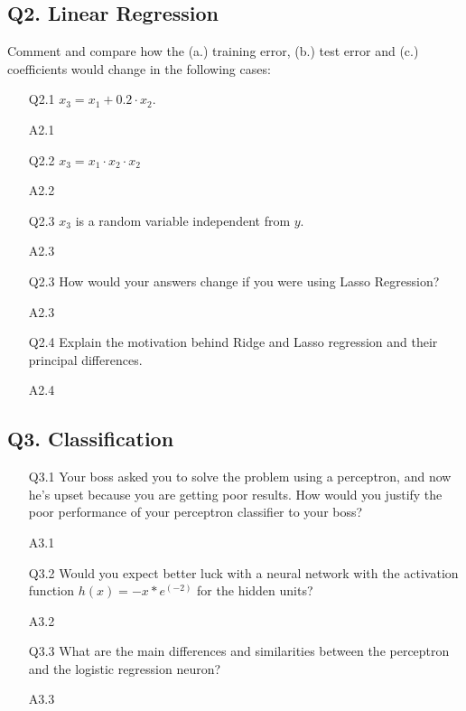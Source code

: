 \documentclass[11pt]{scrartcl}
\begin{document}
\subsection*{Q2. Linear Regression}
Comment and compare how the (a.) training error, (b.) test error and (c.) coefficients would change in the following cases:
\begin{itemize}
\item[Q2.1] $x_3 = x_1 + 0.2 \cdot x_2$.
\item[A2.1] ~\\

\item[Q2.2] $x_3 = x_1 \cdot x_2 \cdot x_2$
\item[A2.2] ~\\

\item[Q2.3] $x_3$ is a random variable independent from $y$.
\item[A2.3] ~\\

\item[Q2.3] How would your answers change if you were using Lasso Regression?
\item[A2.3] ~\\

\item[Q2.4] Explain the motivation behind Ridge and Lasso regression and their principal differences.
\item[A2.4] ~\\  
\end{itemize}

\subsection*{Q3. Classification}
\begin{itemize}
\item[Q3.1] Your boss asked you to solve the problem using a perceptron, and now he's upset because you are getting poor results. How would you justify the poor performance of your perceptron classifier to your boss?
\item[A3.1] ~\\

\item[Q3.2] Would you expect better luck with a neural network with the activation function $h(x) = - x * e^(-2)$ for the hidden units?
\item[A3.2] ~\\

\item[Q3.3] What are the main differences and similarities between the perceptron and the logistic regression neuron?
\item[A3.3] ~\\

\end{itemize}
\end{document}
